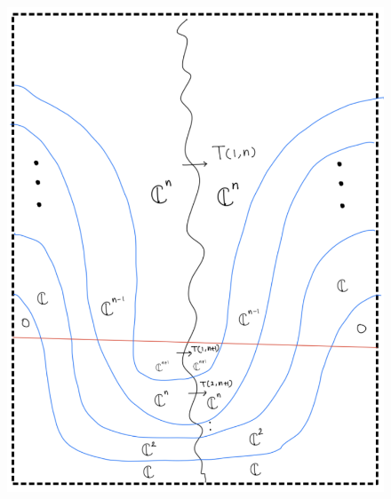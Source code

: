 \begin{enumerate}[label=(\roman*)]
\begin{enumerate}[label=(Step \arabic*)]
\begin{figure}[H]
    \centering
    \includegraphics[scale = 0.95]{diagrams/cobord6/7.png}
    \caption{}
    \label{fig:your-label}
\end{figure}
\end{enumerate}
\end{enumerate}
\pagebreak 
